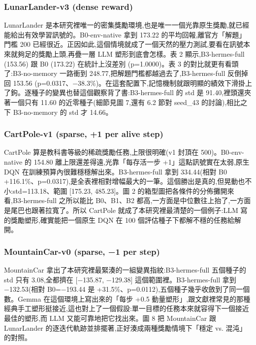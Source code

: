 \documentclass[conference,onecolumn,letterpaper,10pt]{IEEEtran}
\begin{document}
\subsubsection{LunarLander-v3 (dense reward)}

LunarLander 是本研究裡唯一的密集獎勵環境,也是唯一一個光靠原生獎勵,就已經能給出有效學習訊號的。B0-env-native 拿到 173.22 的平均回報,離官方「解題」門檻 200 已經很近。正因如此,這個情境就成了一個天然的壓力測試,要看在訊號本來就夠足的獎勵上頭,再疊一層 LLM 塑形到底會怎樣。表 2 顯示,B3-hermes-full (153.56) 跟 B0 (173.22) 在統計上沒差別 (p=1.0000)。表 3 的對比就更有看頭了:B3-no-memory 一路衝到 248.77,把解題門檻都越過去了,B3-hermes-full 反倒掉回 153.56 (p=0.0317、−38.3\%)。在這套配置下,記憶機制就跟明顯的績效下滑掛上了鉤。逐種子的變異也替這個觀察背了書:B3-hermes-full 的 std 是 91.40,裡頭還夾著一個只有 11.60 的近零種子(細節見圖 7,還有 6.2 節對 seed\_43 的討論),相比之下 B3-no-memory 的 std 才 14.66。

\subsubsection{CartPole-v1 (sparse, +1 per alive step)}

CartPole 算是教科書等級的稀疏獎勵任務,上限很明確(v1 封頂在 500)。B0-env-native 的 154.80 離上限還差得遠,光靠「每存活一步 +1」這點訊號實在太弱,原生 DQN 在訓練預算內很難穩穩解出來。B3-hermes-full 拿到 334.44(相對 B0 +116.1\%、p=0.0317),是全表裡相對增幅最大的一筆。這個勝出是真的,但晃動也不小:std=113.18、範圍 {[}175.23, 485.23{]}。圖 2 的箱型圖把各條件的分佈攤開來看,B3-hermes-full 之所以能比 B0、B1、B2 都高,一方面是中位數往上抬了,一方面是尾巴也跟著拉寬了。所以 CartPole 就成了本研究裡最清楚的一個例子:LLM 寫的獎勵塑形,確實能把一個原生 DQN 在 100 個評估種子下都解不穩的任務給解開。

\subsubsection{MountainCar-v0 (sparse, −1 per step)}

MountainCar 拿出了本研究裡最緊湊的一組變異指紋:B3-hermes-full 五個種子的 std 只有 3.08,全都擠在 {[}−135.87, −129.38{]} 這個範圍裡。B3-hermes-full 拿到 −132.53(相對 B0=−193.44 是 +31.5\%、p=0.0112),五個種子幾乎收斂到了同一個數。Gemma 在這個環境上寫出來的「每步 +0.5 動量塑形」,跟文獻裡常見的那種經典手工塑形挺接近,這也對上了一個假設:單一目標的任務本來就容得下一個接近最佳的塑形,而 LLM 又能可靠地把它找出來。圖 8 把 MountainCar 跟 LunarLander 的逐迭代軌跡並排擺著,正好湊成兩種獎勵情境下「穩定 vs. 混沌」的對照。
\end{document}
